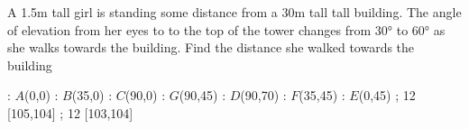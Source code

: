 
%
%
%
%
% 
% 

\question A 1.5m tall girl is standing some distance from a 30m tall tall building.
The angle of elevation from her eyes to to the top of the tower changes from $\ang{30}$
to $\ang{60}$ as she walks towards the building. Find the distance she walked towards the building

\insertQR{}

\ifprintanswers
  \begin{marginfigure}
      : $A$(0,0)
      : $B$(35,0)
      : $C$(90,0)
      : $G$(90,45)
      : $D$(90,70)
      : $F$(35,45)
      : $E$(0,45)
    \figdrawbegin{}
      \figdrawline [100,101,102,103,105,106,100]
      \figdrawline [101,105,104,106]
      \figdrawline [103,104]
       ; 12 [105,104] 
       ; 12 [103,104] 
    \figdrawend
    \centerline{\box\figBoxA}
  \end{marginfigure}
\fi 

